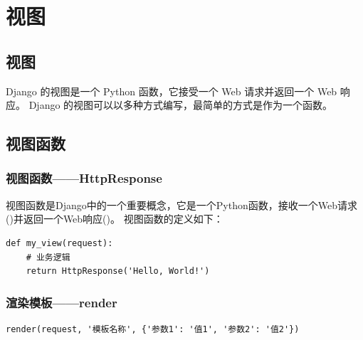 \chapter{视图}
\section{视图}
Django 的视图是一个 Python 函数，它接受一个 Web 请求并返回一个 Web 响应。
Django 的视图可以以多种方式编写，最简单的方式是作为一个函数。

\section{视图函数}
\subsection{视图函数——HttpResponse}
视图函数是Django中的一个重要概念，它是一个Python函数，接收一个Web请求()并返回一个Web响应()。
视图函数的定义如下：
\begin{lstlisting}[style=demostyle, numbers=none]
def my_view(request):
    # 业务逻辑
    return HttpResponse('Hello, World!')
\end{lstlisting}   

\subsection{渲染模板——render}
\begin{lstlisting}[style=demostyle, numbers=none]
render(request, '模板名称', {'参数1': '值1', '参数2': '值2'})    
\end{lstlisting}

